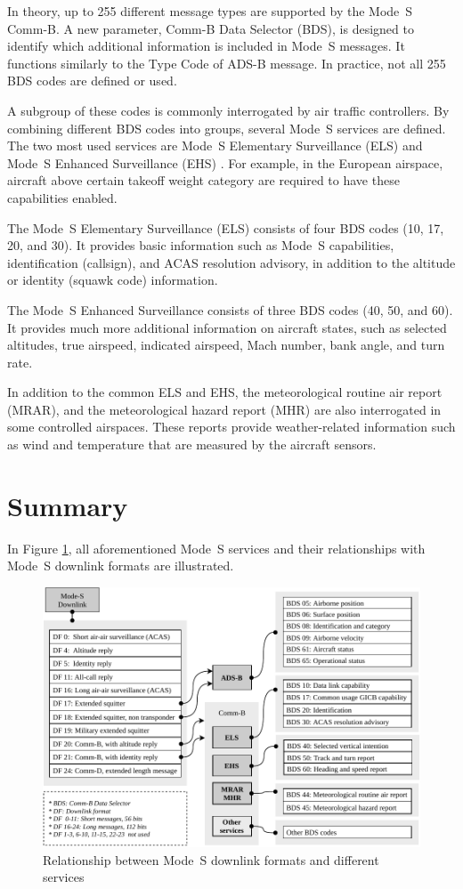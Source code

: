 In theory, up to 255 different message types are supported by the Mode~S Comm-B. A new parameter, Comm-B Data Selector (BDS), is designed to identify which additional information is included in Mode~S messages. It functions similarly to the Type Code of ADS-B message. In practice, not all 255 BDS codes are defined or used. 

A subgroup of these codes is commonly interrogated by air traffic controllers. By combining different BDS codes into groups, several Mode~S services are defined. The two most used services are Mode~S Elementary Surveillance (ELS) and Mode~S Enhanced Surveillance (EHS) \cite{grappel2008}. For example, in the European airspace, aircraft above certain takeoff weight category are required to have these capabilities enabled.

The Mode~S Elementary Surveillance (ELS) consists of four BDS codes (10, 17, 20, and 30). It provides basic information such as Mode~S capabilities, identification (callsign), and ACAS resolution advisory, in addition to the altitude or identity (squawk code) information. 

The Mode~S Enhanced Surveillance consists of three BDS codes (40, 50, and 60). It provides much more additional information on aircraft states, such as selected altitudes, true airspeed, indicated airspeed, Mach number, bank angle, and turn rate.

In addition to the common ELS and EHS, the meteorological routine air report (MRAR), and the meteorological hazard report (MHR) are also interrogated in some controlled airspaces. These reports provide weather-related information such as wind and temperature that are measured by the aircraft sensors.


\section{Summary}

In Figure \ref{fig:mode_s_services}, all aforementioned Mode~S services and their relationships with Mode~S downlink formats are illustrated.

\begin{figure}[ht]
  \centering
  \includegraphics[width=\textwidth]{figures/intro/mode_s_services.pdf}
  \caption{Relationship between Mode~S downlink formats and different services}
  \label{fig:mode_s_services}
\end{figure}

